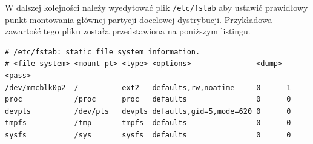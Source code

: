 \documentclass[a4paper,12pt]{book}
\begin{document}
				W dalszej kolejności należy wyedytować plik \texttt{/etc/fstab} aby ustawić prawidłowy punkt montowania głównej partycji docelowej dystrybucji. Przykładowa zawartość tego pliku została przedstawiona na poniższym listingu.
				\begin{lstlisting}[basicstyle={\footnotesize\ttfamily}]
# /etc/fstab: static file system information.
# <file system> <mount pt> <type> <options>               <dump> <pass>
/dev/mmcblk0p2  /          ext2   defaults,rw,noatime     0      1
proc            /proc      proc   defaults                0      0
devpts          /dev/pts   devpts defaults,gid=5,mode=620 0      0
tmpfs           /tmp       tmpfs  defaults                0      0
sysfs           /sys       sysfs  defaults                0      0	

				\end{lstlisting}
\end{document}
